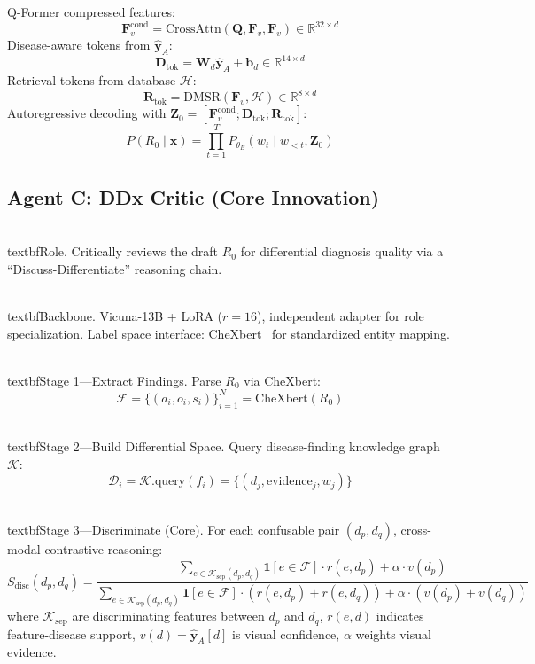 \documentclass[runningheads,10pt]{llncs}
\newcommand{\Fv}{\mathbf{F}_v}
\newcommand{\yhat}{\hat{\mathbf{y}}}
\newcommand{\Stotal}{S_{\text{disc}}}
\newcommand{\Ksep}{\mathcal{K}_{\text{sep}}}
\begin{document}
Q-Former compressed features:
\begin{equation}
\Fv^{\text{cond}} = \text{CrossAttn}(\mathbf{Q}, \Fv, \Fv) \in \mathbb{R}^{32 \times d} \label{eq:qformer}
\end{equation}
Disease-aware tokens from $\yhat_A$:
\begin{equation}
\mathbf{D}_{\text{tok}} = \mathbf{W}_d \yhat_A + \mathbf{b}_d \in \mathbb{R}^{14 \times d} \label{eq:dast}
\end{equation}
Retrieval tokens from database $\mathcal{H}$:
\begin{equation}
\mathbf{R}_{\text{tok}} = \text{DMSR}(\Fv, \mathcal{H}) \in \mathbb{R}^{8 \times d} \label{eq:dmsr}
\end{equation}
Autoregressive decoding with $\mathbf{Z}_0 = [\Fv^{\text{cond}}; \mathbf{D}_{\text{tok}}; \mathbf{R}_{\text{tok}}]$:
\begin{equation}
P(R_0 \mid \mathbf{x}) = \prod_{t=1}^{T} P_{\theta_B}(w_t \mid w_{<t}, \mathbf{Z}_0) \label{eq:gen}
\end{equation}

\subsection{Agent C: DDx Critic (Core Innovation)}

\\textbf{Role.} Critically reviews the draft $R_0$ for differential diagnosis quality via a ``Discuss-Differentiate'' reasoning chain.

\\textbf{Backbone.} Vicuna-13B + LoRA ($r=16$), independent adapter for role specialization. Label space interface: CheXbert~\cite{chexpert} for standardized entity mapping.

\\textbf{Stage 1---Extract Findings.} Parse $R_0$ via CheXbert:
\begin{equation}
\mathcal{F} = \{ (a_i, o_i, s_i) \}_{i=1}^{N} = \text{CheXbert}(R_0) \label{eq:extract}
\end{equation}

\\textbf{Stage 2---Build Differential Space.} Query disease-finding knowledge graph $\mathcal{K}$:
\begin{equation}
\mathcal{D}_i = \mathcal{K}.\text{query}(f_i) = \{ (d_j, \text{evidence}_j, w_j) \} \label{eq:diffspace}
\end{equation}

\\textbf{Stage 3---Discriminate (Core).} For each confusable pair $(d_p, d_q)$, cross-modal contrastive reasoning:
\begin{equation}
\boxed{
\Stotal(d_p, d_q) = \frac{
 \sum_{e \in \Ksep(d_p, d_q)} \mathbf{1}[e \in \mathcal{F}] \cdot r(e, d_p)
 + \alpha \cdot v(d_p)
}{
 \sum_{e \in \Ksep(d_p, d_q)} \mathbf{1}[e \in \mathcal{F}] \cdot (r(e, d_p) + r(e, d_q))
 + \alpha \cdot (v(d_p) + v(d_q))
}
} \label{eq:disc}
\end{equation}
where $\Ksep$ are discriminating features between $d_p$ and $d_q$, $r(e,d)$ indicates feature-disease support, $v(d)=\yhat_A[d]$ is visual confidence, $\alpha$ weights visual evidence.
\end{document}
